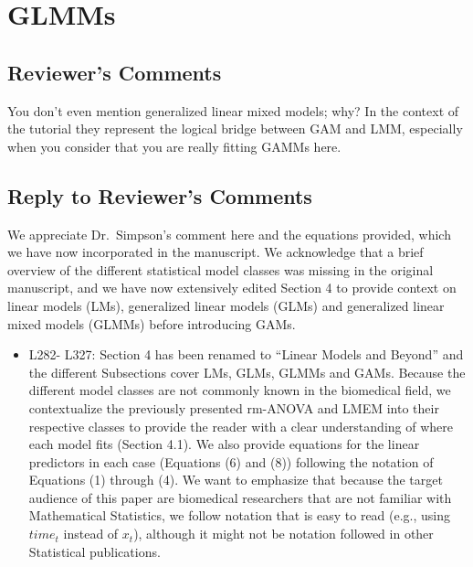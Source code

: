\documentclass[
]{article}
\providecommand{\tightlist}{%
  \setlength{\itemsep}{0pt}\setlength{\parskip}{0pt}}
\begin{document}
\hypertarget{glmms}{%
\section{GLMMs}\label{glmms}}

\hypertarget{reviewers-comments-2}{%
\subsection{Reviewer's Comments}\label{reviewers-comments-2}}

You don't even mention generalized linear mixed models; why? In the context of the tutorial they represent the logical bridge between GAM and LMM, especially when you consider that you are really fitting GAMMs here.

\hypertarget{section-3}{%
\subsection{\texorpdfstring{\textcolor{reviewersblue} {Reply to Reviewer's Comments}}{}}\label{section-3}}

We appreciate Dr.~Simpson's comment here and the equations provided, which we have now incorporated in the manuscript. We acknowledge that a brief overview of the different statistical model classes was missing in the original manuscript, and we have now extensively edited Section 4 to provide context on linear models (LMs), generalized linear models (GLMs) and generalized linear mixed models (GLMMs) before introducing GAMs.

\begin{itemize}
\tightlist
\item
  L282- L327: Section 4 has been renamed to ``Linear Models and Beyond'' and the different Subsections cover LMs, GLMs, GLMMs and GAMs. Because the different model classes are not commonly known in the biomedical field, we contextualize the previously presented rm-ANOVA and LMEM into their respective classes to provide the reader with a clear understanding of where each model fits (Section 4.1). We also provide equations for the linear predictors in each case (Equations (6) and (8)) following the notation of Equations (1) through (4). We want to emphasize that because the target audience of this paper are biomedical researchers that are not familiar with Mathematical Statistics, we follow notation that is easy to read (e.g., using \(time_t\) instead of \(x_t\)), although it might not be notation followed in other Statistical publications.
\end{itemize}
\end{document}

